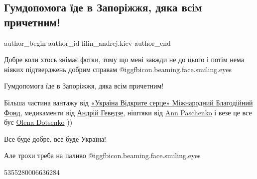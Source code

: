  
 
 
 
 
 
\subsection{Гумдопомога їде в Запоріжжя, дяка всім причетним!}
\label{sec:12_05_2022.fb.filin_andrej.kiev.1.gumdopomoga}
 
\ifcmt
 author_begin
   author_id filin_andrej.kiev
 author_end
\fi

Добре коли хтось знімає фотки, тому що мені завжди не до цього і потім нема
ніяких підтверджень добрим справам  @igg{fbicon.beaming.face.smiling.eyes} 

Гумдопомога їде в Запоріжжя, дяка всім причетним!


Більша частина вантажу від
\href{https://www.facebook.com/ukrainianopenhearthelp/}{«Україна Відкрите
серце» Міжнародний Благодійний Фонд}, медикаменти від
\href{https://www.facebook.com/andry.hevedze}{Андрій Геведзе}, ніштяки від
\href{https://www.facebook.com/ann.paschenko}{Ann Paschenko} і везе це все бус
\href{https://www.facebook.com/profile.php?id=100005643365993}{Olena Dotsenko} ))

Все буде добре, все буде Україна!

Але трохи треба на паливо  @igg{fbicon.beaming.face.smiling.eyes} 

5355280006636284

